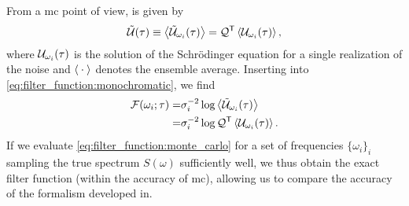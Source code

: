 From a \gls{mc} point of view, \liouvUe is given by
\begin{align}
    \liouvUe(\tau) \equiv \expval{\liouvUe_{\omega_i}(\tau)} = \liouvQ\transpose \expval{\liouvU_{\omega_i}(\tau)},
\end{align}
where $\mathcal{U}_{\omega_i}(\tau)$ is the solution of the Schrödinger equation for a single realization of the noise and $\expval{\:\cdot\:}$ denotes the ensemble average.
Inserting into \cref{eq:filter_function:monochromatic}, we find
\begin{equation}
    \label{eq:filter_function:monte_carlo}
    \begin{split}
        \mc{F}(\omega_i; \tau) =& \sigma_i^{-2}\log\expval{\liouvUe_{\omega_i}(\tau)} \\
                               =& \sigma_i^{-2}\log\liouvQ\transpose\expval{\liouvU_{\omega_i}(\tau)}.
    \end{split}
\end{equation}
If we evaluate \cref{eq:filter_function:monte_carlo} for a set of frequencies $\lbrace\omega_i\rbrace_i$ sampling the true spectrum $S(\omega)$ sufficiently well, we thus obtain the exact filter function \FF (within the accuracy of \gls{mc}), allowing us to compare the accuracy of the formalism developed in.

